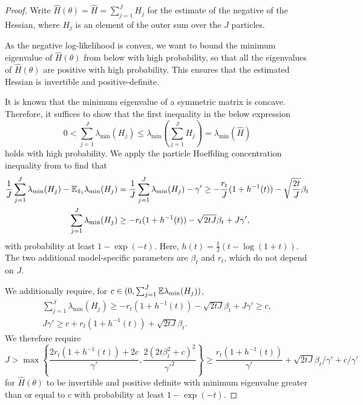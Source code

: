 \begin{proof}
Write $\hat{H}(\theta) = \hat{H} = \sum_{j=1}^J H_j$ for the estimate of the negative of the Hessian, where $H_j$ is an element of the outer sum over the $J$ particles.

As the negative log-likelihood is convex, we want to bound the minimum eigenvalue of $\hat{H}(\theta)$ from below with high probability, so that all the eigenvalues of $\hat{H}(\theta)$ are positive with high probability. This ensures that the estimated Hessian is invertible and positive-definite.

It is known that the minimum eigenvalue of a symmetric matrix is concave. Therefore, it suffices to show that the first inequality in the below expression
\begin{equation}
    0 < \sum_{j=1}^J \lambda_{\min} (H_j) \leq  \lambda_{\min}\left(\sum_{j=1}^J H_j\right) = \lambda_{\min} (\hat{H})
\end{equation}
holds with high probability.
We apply the particle Hoeffding concentration inequality from \cite{delMoral11} to find that  
\begin{align}
    \frac{1}{J}\sum_{j=1}^J \lambda_{\min}(H_j) - \mathbb{E}_{\tilde{\pi}_t}\lambda_{\min}(H_j) &= \frac{1}{J}\sum_{j=1}^J \lambda_{\min}(H_j) - \gamma' \geq -\frac{r_t}{J}(1+h^{-1}(t)) - \sqrt{\frac{2t}{J}}\beta_t \\
    \sum_{j=1}^J \lambda_{\min}(H_j) &\geq -r_t(1+h^{-1}(t)) - \sqrt{2tJ}\beta_t + J\gamma',
\end{align}
with probability at least $1-\exp(-t)$. Here, $h(t) = \frac{1}{2}(t - \log(1+t))$. 
The two additional model-specific parameters are $\beta_t$ and $r_t$, which do not depend on $J$. 

We additionally require, for $c \in (0, \sum_{j=1}^J \mathbb{E}\lambda_{\min}(H_j))$,
\begin{align}
    \sum_{j=1}^J \lambda_{\min}(H_j) \geq -r_t(1+h^{-1}(t)) - \sqrt{2tJ}\beta_t + J\gamma' \geq c, \\
    J\gamma' \geq c + r_t(1+h^{-1}(t)) + \sqrt{2tJ}\beta_t.
\end{align}
We therefore require 
\begin{equation}
J > \max\left\{\frac{2r_t(1+h^{-1}(t)) + 2c}{\gamma'}, \frac{2(2t\beta_t^2+c)^2}{\gamma'^2}\right\} \geq  \frac{r_t(1+h^{-1}(t))}{\gamma'} + \sqrt{2tJ}\beta_t/\gamma' + c/\gamma'    
\end{equation}
for $\hat{H}(\theta)$ to be invertible and positive definite with minimum eigenvalue greater than or equal to $c$ with probability at least $1-\exp(-t)$.

\end{proof}


